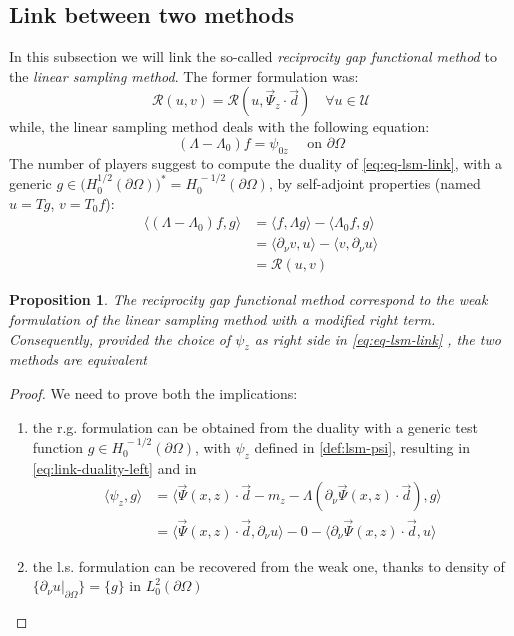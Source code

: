 \documentclass[10pt, a4paper, twoside, openright]{book}
\theoremstyle{definition}
\theoremstyle{plain}
\theoremstyle{plain}
\theoremstyle{plain}
\newtheorem{proposition}[subsection]{Proposition}
\theoremstyle{plain}
\theoremstyle{plain}
\theoremstyle{plain}
\theoremstyle{plain}
\theoremstyle{plain}
\begin{document}
\subsection{Link between two methods}
In this subsection we will link the so-called \textit{reciprocity gap functional method} to the \emph{linear sampling method}.
The former formulation was:
\begin{equation}
 \mathcal{R}(u, v) = \mathcal{R}(u, \vec{\Psi}_z\cdot\vec{d})\quad \forall u \in \mathcal{U}
\end{equation}
while, the linear sampling method deals with the following equation:
\begin{equation}
\label{eq:eq-lsm-link}
 (\Lambda - \Lambda_0)f = \psi_{0z} \quad \text{ on }\partial \Omega
\end{equation}
The number of players suggest to compute the duality of \ref{eq:eq-lsm-link}, with a generic 
${g \in \bigl(H^{1/2}_0(\partial \Omega)\bigr)^* = H^{\,-1/2}_0(\partial \Omega)}$, by self-adjoint properties (named $u=Tg$, $v=T_0f$):
\begin{align}
 \label{eq:link-duality-left}
 \langle(\Lambda - \Lambda_0)f,g\rangle & =  \langle f,\Lambda g\rangle - \langle \Lambda_0 f,g\rangle \\
                                        & = \langle \partial_\nu v,u\rangle - \langle v,\partial_\nu u\rangle \\
                                        & = \mathcal{R}(u,v)
\end{align}
\begin{proposition}
 The \textit{reciprocity gap functional method} correspond to the weak formulation of the \textit{linear sampling method} with a modified right term. Consequently, provided the choice of $\psi_z$ as right side in \ref{eq:eq-lsm-link} , the two methods are equivalent
\end{proposition}
\begin{proof}
 We need to prove both the implications:
\begin{enumerate}
 \item the r.g. formulation can be obtained from the duality with a generic test function $g\in H^{\, -1/2}_0(\partial \Omega)$, with $\psi_z$ defined in \ref{def:lsm-psi}, resulting in \ref{eq:link-duality-left} and in
\begin{align}
 \langle \psi_z , g \rangle  & = \langle \vec{\Psi}(x,z)\cdot\vec{d} - m_z - \Lambda(\partial_\nu \vec{\Psi}(x,z) \cdot \vec{d}) , g \rangle \\
                             & = \langle \vec{\Psi}(x,z)\cdot\vec{d},\partial_\nu u\rangle - 0 - \langle\partial_\nu \vec{\Psi}(x,z) \cdot \vec{d},u\rangle
\end{align}
 \item the l.s. formulation can be recovered from the weak one, thanks to density of $\{\partial_\nu u|_{\partial \Omega}\}=\{g\}$ in $L_0^2(\partial \Omega)$
\end{enumerate}
\end{proof}
\end{document}
